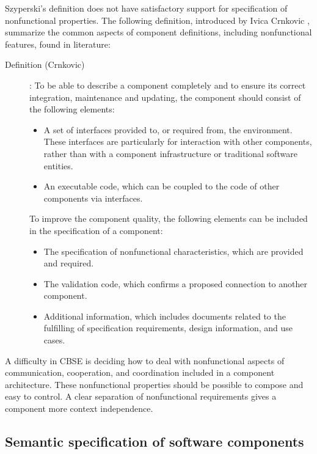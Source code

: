 Szyperski's definition does not have satisfactory support for specification of
nonfunctional properties. 
The following definition, introduced by Ivica Crnkovic \cite{IVICA2002}, 
summarize the common aspects of component definitions, including 
nonfunctional features, found in literature:
\begin{description} 
\item [Definition (Crnkovic)]: 
To be able to describe a component completely and to ensure its correct
integration, maintenance and updating, the component should consist of
the following elements:
	\begin{itemize}
	\item A set of interfaces provided to, or required from, 
	the environment.
	These interfaces are particularly for interaction with other components,
	rather than with a component infrastructure or traditional software
	entities.
	\item An executable code, which can be coupled to the code of other 
	components via interfaces.
	\end{itemize}
	To improve the component quality, the following elements can be included
	in the specification of a component:
	\begin{itemize}
	\item The specification of nonfunctional characteristics, which are 
	provided and required.	
	\item The validation code, which confirms a proposed connection to 
	another component.
	\item Additional information, which includes documents related to the 
	fulfilling of specification requirements, design information, and use 
	cases.
	\end{itemize}
\end{description}

\noindent
A difficulty in CBSE is deciding how to deal with nonfunctional aspects
of communication, cooperation, and coordination included in a component
architecture.
These nonfunctional properties should be possible to compose and easy to
control.
A clear separation of nonfunctional requirements gives a component more
context independence.


\subsection{Semantic specification of software components}

